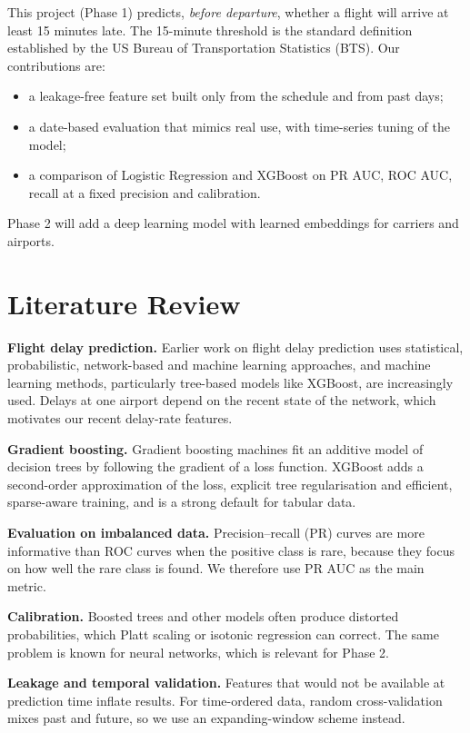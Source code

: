 \documentclass[conference]{IEEEtran}
\begin{document}
This project (Phase 1) predicts, \emph{before departure}, whether a flight will arrive at least 15 minutes late.
The 15-minute threshold is the standard definition established by the US Bureau of Transportation Statistics (BTS).
Our contributions are:
\begin{itemize}
\item a leakage-free feature set built only from the schedule and from past days;
\item a date-based evaluation that mimics real use, with time-series tuning of the model;
\item a comparison of Logistic Regression and XGBoost on PR AUC, ROC AUC, recall at a fixed precision and
calibration.
\end{itemize}
Phase 2 will add a deep learning model with learned embeddings for carriers and airports.

\section{Literature Review}
\textbf{Flight delay prediction.} Earlier work on flight delay prediction uses statistical, probabilistic,
network-based and machine learning approaches, and machine learning methods, particularly tree-based models like XGBoost, are increasingly
used. Delays at one airport depend on the recent state of the network, which motivates our recent delay-rate
features.

\textbf{Gradient boosting.} Gradient boosting machines fit an additive model of decision trees by following the
gradient of a loss function. XGBoost adds a second-order approximation of the loss, explicit tree regularisation
and efficient, sparse-aware training, and is a strong default for tabular data.

\textbf{Evaluation on imbalanced data.} Precision--recall (PR) curves are more informative than ROC curves when
the positive class is rare, because they focus on how well the rare class is found. We therefore use PR AUC as
the main metric.

\textbf{Calibration.} Boosted trees and other models often produce distorted probabilities, which Platt scaling or
isotonic regression can correct. The same problem is known for neural networks, which is relevant for Phase 2.

\textbf{Leakage and temporal validation.} Features that would not be available at prediction time inflate
results. For time-ordered data, random cross-validation mixes past and future, so we use an expanding-window
scheme instead.
\end{document}
